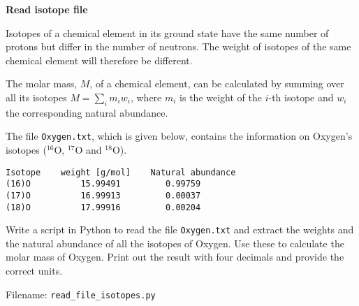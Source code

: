 \begin{Problem}{\textbf{Read isotope file}} 

\noindent 
Isotopes of a chemical element in its ground state have the same number of protons but differ in the number of neutrons. The weight of isotopes of the same chemical element will therefore be different. 
 
The molar mass, $M$, of a chemical element, can be calculated by summing over all its isotopes $ M =  \sum_{i} m_i w_i $, where $m_i$ is the weight of the $i$-th isotope and $w_i$ the corresponding natural abundance.

The file \texttt{Oxygen.txt}, which is given below, contains the information on Oxygen's isotopes ($\mathrm{^{16}O}$, $\mathrm{^{17}O}$ and $\mathrm{^{18}O}$).
\begin{lstlisting}
Isotope    weight [g/mol]    Natural abundance
(16)O          15.99491         0.99759
(17)O          16.99913         0.00037
(18)O          17.99916         0.00204
\end{lstlisting} 

Write a script in Python to read the file \texttt{Oxygen.txt} and extract the weights and the natural abundance of all the isotopes of Oxygen. Use these to calculate the molar mass of Oxygen. Print out the result with four decimals and provide the correct units. 

Filename: \texttt{read\_file\_isotopes.py}
\end{Problem}

